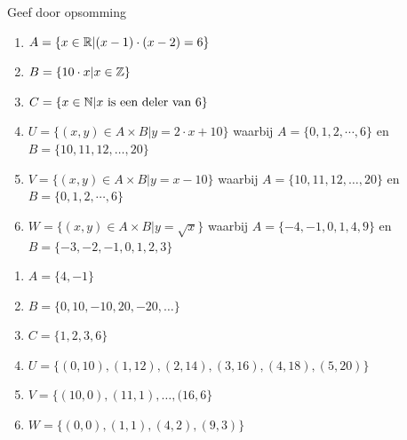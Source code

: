 \begin{oef}
Geef door opsomming
\begin{enumerate}
  \item $A=\{x \in \mathbb{R} | (x-1)\cdot(x-2)=6\}$
  \item $B=\{10\cdot x|x\in\mathbb{Z} \}$
  \item $C=\{ x\in \mathbb{N}| x \textrm{ is een deler van } 6\}$
  \item $U = \{(x, y) \in A \times B|y = 2\cdot x + 10\}$ waarbij $A = \{0,1,2,\cdots,6\}$ en \\$B = \{10,11,12,\dots,20\}$
  \item $V = \{(x, y) \in A \times B|y = x - 10\}$ waarbij  $A = \{10,11,12,\dots,20\}$ en \\ $B = \{0,1,2,\cdots,6\}$
  \item $W = \{(x, y) \in A \times  B|y = \sqrt{x}\}$ waarbij $A=\{-4,-1,0,1,4,9\}$ en \\ 
        $B=\{-3,-2,-1,0,1,2,3\}$
\end{enumerate}
\begin{opl}
\begin{enumerate}
  \item $A=\{4,-1\}$
  \item $B=\{0,10,-10,20,-20,\dots\}$
  \item $C=\{1,2,3,6\}$
  \item $U=\{(0,10),(1,12),(2,14),(3,16),(4,18),(5,20)\}$
  \item $V=\{(10,0),(11,1),\dots, (16,6\}$
  \item $W=\{(0,0),(1,1),(4,2),(9,3)\}$
\end{enumerate}
\end{opl}
\end{oef}




